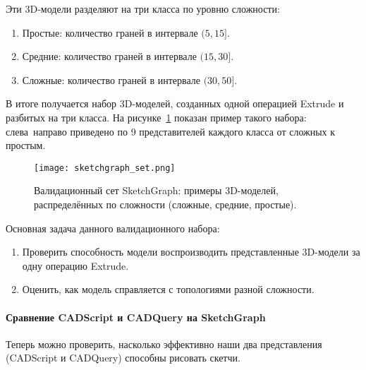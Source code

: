 Эти 3D-модели разделяют на три класса по уровню сложности:
\begin{enumerate}
    \item Простые: количество граней в интервале $(5, 15]$.
    \item Средние: количество граней в интервале $(15, 30]$.
    \item Сложные: количество граней в интервале $(30, 50]$.
\end{enumerate}

В итоге получается набор 3D-моделей, созданных одной операцией Extrude и разбитых на три класса. На рисунке~\ref{fig:sketchgraph_set} показан пример такого набора: слева~направо приведено по 9 представителей каждого класса от сложных к простым.

\begin{figure}[h!]
    \centering
    \texttt{[image: sketchgraph\_set.png]}
    \caption{Валидационный сет SketchGraph: примеры 3D-моделей, распределённых по сложности (сложные, средние, простые).}
    \label{fig:sketchgraph_set}
\end{figure}

Основная задача данного валидационного набора:
\begin{enumerate}
    \item Проверить способность модели воспроизводить представленные 3D-модели за одну операцию Extrude.
    \item Оценить, как модель справляется с топологиями разной сложности.
\end{enumerate}

\paragraph{Сравнение CADScript и CADQuery на SketchGraph}

Теперь можно проверить, насколько эффективно наши два представления (CADScript и CADQuery) способны рисовать скетчи.


